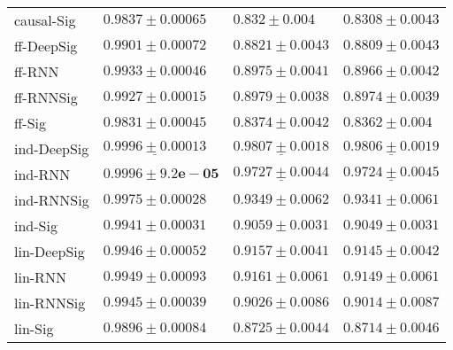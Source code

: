 \begin{tabular}{llll}
causal-Sig     &                           $ 0.9837 \pm 0.00065 $ &                             $ 0.832 \pm 0.004 $ &                           $ 0.8308 \pm 0.0043 $ \\
ff-DeepSig     &                           $ 0.9901 \pm 0.00072 $ &                           $ 0.8821 \pm 0.0043 $ &                           $ 0.8809 \pm 0.0043 $ \\
ff-RNN         &                           $ 0.9933 \pm 0.00046 $ &                           $ 0.8975 \pm 0.0041 $ &                           $ 0.8966 \pm 0.0042 $ \\
ff-RNNSig      &                           $ 0.9927 \pm 0.00015 $ &                           $ 0.8979 \pm 0.0038 $ &                           $ 0.8974 \pm 0.0039 $ \\
ff-Sig         &                           $ 0.9831 \pm 0.00045 $ &                           $ 0.8374 \pm 0.0042 $ &                            $ 0.8362 \pm 0.004 $ \\
ind-DeepSig    &  $  \mathbf{ \underline{ 0.9996 \pm 0.00013 }} $ &  $  \mathbf{ \underline{ 0.9807 \pm 0.0018 }} $ &  $  \mathbf{ \underline{ 0.9806 \pm 0.0019 }} $ \\
ind-RNN        &               $  \mathbf{ 0.9996 \pm 9.2e-05 } $ &            $  \underline{ 0.9727 \pm 0.0044 } $ &            $  \underline{ 0.9724 \pm 0.0045 } $ \\
ind-RNNSig     &                           $ 0.9975 \pm 0.00028 $ &                           $ 0.9349 \pm 0.0062 $ &                           $ 0.9341 \pm 0.0061 $ \\
ind-Sig        &                           $ 0.9941 \pm 0.00031 $ &                           $ 0.9059 \pm 0.0031 $ &                           $ 0.9049 \pm 0.0031 $ \\
lin-DeepSig    &                           $ 0.9946 \pm 0.00052 $ &                           $ 0.9157 \pm 0.0041 $ &                           $ 0.9145 \pm 0.0042 $ \\
lin-RNN        &                           $ 0.9949 \pm 0.00093 $ &                           $ 0.9161 \pm 0.0061 $ &                           $ 0.9149 \pm 0.0061 $ \\
lin-RNNSig     &                           $ 0.9945 \pm 0.00039 $ &                           $ 0.9026 \pm 0.0086 $ &                           $ 0.9014 \pm 0.0087 $ \\
lin-Sig        &                           $ 0.9896 \pm 0.00084 $ &                           $ 0.8725 \pm 0.0044 $ &                           $ 0.8714 \pm 0.0046 $ \\

\end{tabular}
